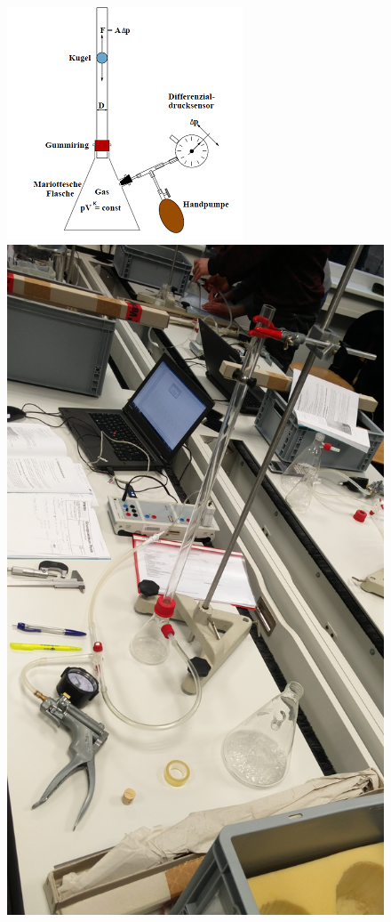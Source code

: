 \documentclass[a4paper, 11pt]{article}
\begin{document}
\begin{figure}[H]
	\begin{minipage}[t]{0.45\linewidth}
		\centering
		\includegraphics[scale=1]{Aufbau.png}
	\end{minipage}
	\hspace{0.05\linewidth}
	\begin{minipage}[t]{0.45\linewidth}
		\centering
		\includegraphics[scale=0.1,clip,trim=0cm 10cm 0cm 10cm]{Aufbau.jpg}

\end{minipage}
\end{figure}
\end{document}
